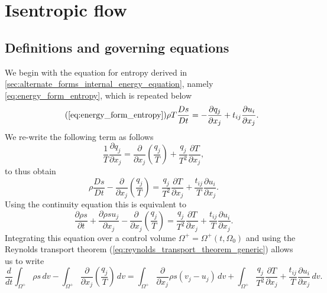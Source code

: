 \documentclass[oneside,a4paper,11pt]{report}
\begin{document}
\section{Isentropic flow}

\subsection{Definitions and governing equations}
We begin with the equation for entropy derived in \cref{sec:alternate_forms_internal_energy_equation}, namely \cref{eq:energy_form_entropy}, which is repeated below
\begin{equation}
\tag{\ref{eq:energy_form_entropy}}
    \rho T \frac{Ds}{Dt} = -\frac{\partial q_j}{\partial x_j} + t_{ij} \frac{\partial u_i}{\partial x_j}.
\end{equation}
We re-write the following term as follows
\begin{equation*}
    \frac{1}{T} \frac{\partial q_j}{\partial x_j} = \frac{\partial}{\partial x_j} \left ( \frac{q_j}{T} \right ) + \frac{q_j}{T^2}\frac{\partial T}{\partial x_j},
\end{equation*}
to thus obtain
\begin{equation*}
    \rho \frac{Ds}{Dt} - \frac{\partial}{\partial x_j} \left ( \frac{q_j}{T} \right ) = \frac{q_j}{T^2}\frac{\partial T}{\partial x_j} + \frac{t_{ij}}{T} \frac{\partial u_i}{\partial x_j}.
\end{equation*}
Using the continuity equation this is equivalent to
\begin{equation*}
    \frac{\partial \rho s}{\partial t} + \frac{\partial \rho s u_j}{\partial x_j} - \frac{\partial}{\partial x_j} \left ( \frac{q_j}{T} \right ) = \frac{q_j}{T^2}\frac{\partial T}{\partial x_j} + \frac{t_{ij}}{T} \frac{\partial u_i}{\partial x_j}.
\end{equation*}
Integrating this equation over a control volume $\Omega^+ = \Omega^+(t,\Omega_0)$ and using the Reynolds transport theorem (\cref{eq:reynolds_transport_theorem_generic}) allows us to write
\begin{equation*}
    \frac{d}{dt} \int_{\Omega^+} \rho s \, dv - \int_{\Omega^+} \frac{\partial}{\partial x_j} \left ( \frac{q_j}{T} \right ) \,dv = \int_{\Omega^+} \frac{\partial}{\partial x_j} \rho s \left (v_j - u_j \right ) \, dv + \int_{\Omega^+} \frac{q_j}{T^2}\frac{\partial T}{\partial x_j} + \frac{t_{ij}}{T} \frac{\partial u_i}{\partial x_j} \, dv.
\end{equation*}
\end{document}
